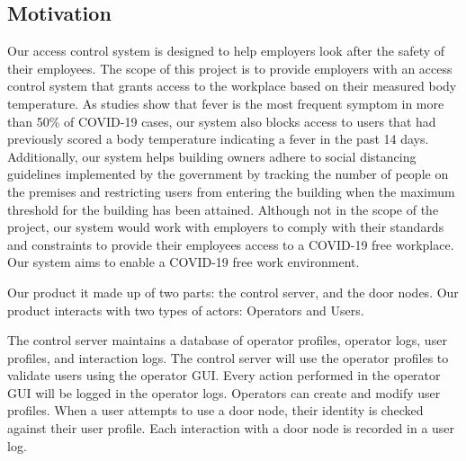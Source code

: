 \subsection{Motivation}

Our access control system is designed to help employers look after the safety
of their employees. The scope of this project is to provide employers with an
access control system that grants access to the workplace based on their
measured body temperature. As studies show that fever is the most frequent
symptom in more than 50\% of COVID-19 cases, our system also blocks access to
users that had previously scored a body temperature indicating a fever in the
past 14 days. Additionally, our system helps building owners adhere to social
distancing guidelines implemented by the government by tracking the number of
people on the premises and restricting users from entering the building when
the maximum threshold for the building has been attained. Although not in the
scope of the project, our system would work with employers to comply with their
standards and constraints to provide their employees access to a COVID-19 free
workplace. Our system aims to enable a COVID-19 free work environment.


Our product it made up of two parts: the control server, and the door nodes.
Our product interacts with two types of actors: Operators and Users.


The control server maintains a database of operator profiles, operator logs,
user profiles, and interaction logs.  The control server will use the operator
profiles to validate users using the operator GUI.  Every action performed in
the operator GUI will be logged in the operator logs.  Operators can create and
modify user profiles.  When a user attempts to use a door node, their identity
is checked against their user profile.  Each interaction with a door node is
recorded in a user log.
